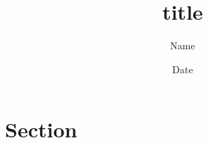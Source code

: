 \documentclass{article}
\title{title}
\author{Name}
\date{Date}
\begin{document}
\maketitle

\section{Section}
\end{document}
